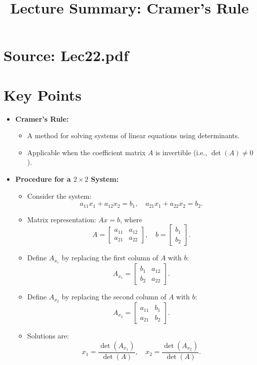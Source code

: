 \documentclass{article}
\title{Lecture Summary: Cramer’s Rule}
\author{}
\date{}
\begin{document}
\maketitle

\section*{Source: Lec22.pdf}

\section*{Key Points}

\begin{itemize}
  \item \textbf{Cramer’s Rule:}
    \begin{itemize}
      \item A method for solving systems of linear equations using determinants.
      \item Applicable when the coefficient matrix $A$ is invertible (i.e., $\det(A) \neq 0$).
    \end{itemize}

  \item \textbf{Procedure for a $2 \times 2$ System:}
    \begin{itemize}
      \item Consider the system:
        \[
          a_{11}x_1 + a_{12}x_2 = b_1, \quad a_{21}x_1 + a_{22}x_2 = b_2.
        \]
      \item Matrix representation: $Ax = b$, where
        \[
          A =
          \begin{bmatrix}
            a_{11} & a_{12} \\
            a_{21} & a_{22}
          \end{bmatrix},
          \quad
          b =
          \begin{bmatrix}
            b_1 \\
            b_2
          \end{bmatrix}.
        \]
      \item Define $A_{x_1}$ by replacing the first column of $A$ with $b$:
        \[
          A_{x_1} =
          \begin{bmatrix}
            b_1 & a_{12} \\
            b_2 & a_{22}
          \end{bmatrix}.
        \]
      \item Define $A_{x_2}$ by replacing the second column of $A$ with $b$:
        \[
          A_{x_2} =
          \begin{bmatrix}
            a_{11} & b_1 \\
            a_{21} & b_2
          \end{bmatrix}.
        \]
      \item Solutions are:
        \[
          x_1 = \frac{\det(A_{x_1})}{\det(A)}, \quad x_2 = \frac{\det(A_{x_2})}{\det(A)}.
        \]
    \end{itemize}


\end{itemize}
\end{document}
